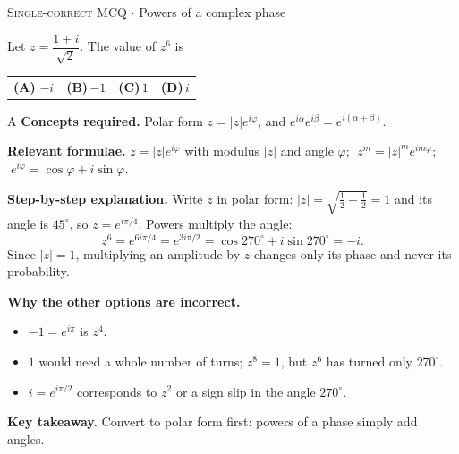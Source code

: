 \documentclass[11pt,a4paper]{article}
\newcommand{\optlabel}[1]{\textbf{(#1)}}
\newcommand{\correctlabel}[1]{\textcolor{okgreen}{\textbf{(#1)}\,\ding{51}}}
\newenvironment{qitem}[1]{\begin{list}{}{\setlength{\leftmargin}{3.3em}\setlength{\labelwidth}{3.1em}%
  \setlength{\labelsep}{0.2em}\setlength{\topsep}{3pt}\setlength{\parsep}{3pt}}\item[\textbf{Q.#1}\hfill]}{\end{list}}
\newcommand{\qsep}{\par\vspace{2pt}{\color{black!15}\hrule}\vspace{4pt}}
\newcommand{\qmeta}[2]{{\footnotesize\color{black!60}\textsc{#1} \;$\cdot$\; #2}\par}
\begin{document}
\begin{qitem}{5}
\qmeta{Single-correct MCQ}{Powers of a complex phase}
Let $z = \dfrac{1 + i}{\sqrt2}$. The value of $z^6$ is
\par\smallskip\noindent\begin{tabularx}{\linewidth}{@{}*{4}{L}@{}}
\correctlabel{A}\,$-i$ & \optlabel{B}\,$-1$ & \optlabel{C}\,$1$ & \optlabel{D}\,$i$
\end{tabularx}
\end{qitem}
\begin{solbox}{A}
\textbf{\color{brand}Concepts required.} Polar form $z = |z|e^{i\varphi}$, and $e^{i\alpha}e^{i\beta} = e^{i(\alpha+\beta)}$.

\textbf{\color{brand}Relevant formulae.} $z = |z|e^{i\varphi}$ with modulus $|z|$ and angle $\varphi$; $\;z^m = |z|^me^{im\varphi}$; $\;e^{i\varphi} = \cos\varphi + i\sin\varphi$.

\textbf{\color{brand}Step-by-step explanation.} Write $z$ in polar form: $|z| = \sqrt{\frac12 + \frac12} = 1$ and its angle is $45^\circ$, so $z = e^{i\pi/4}$. Powers multiply the angle:
\[ z^6 = e^{6i\pi/4} = e^{3i\pi/2} = \cos 270^\circ + i\sin 270^\circ = -i. \]
Since $|z| = 1$, multiplying an amplitude by $z$ changes only its phase and never its probability.

\textbf{\color{brand}Why the other options are incorrect.}
\begin{itemize}[leftmargin=2.4em, itemsep=1pt, topsep=2pt]
\item[\textbf{(B)}] $-1 = e^{i\pi}$ is $z^4$.
\item[\textbf{(C)}] $1$ would need a whole number of turns; $z^8 = 1$, but $z^6$ has turned only $270^\circ$.
\item[\textbf{(D)}] $i = e^{i\pi/2}$ corresponds to $z^2$ or a sign slip in the angle $270^\circ$.
\end{itemize}
\textbf{\color{brand}Key takeaway.} Convert to polar form first: powers of a phase simply add angles.
\end{solbox}
\qsep
\end{document}
